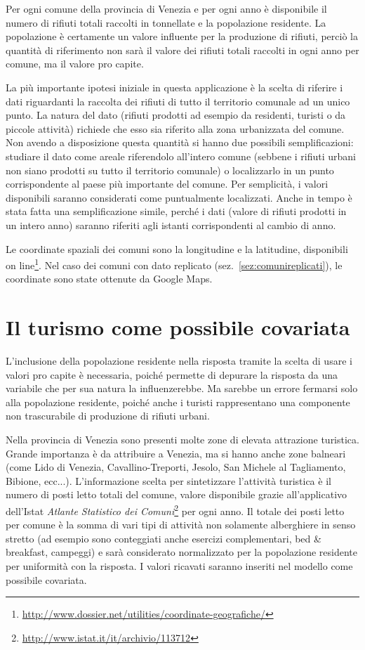 \documentclass[a4paper,11pt,twoside,openright]{book}							%
\begin{document}
Per ogni comune della provincia di Venezia e per ogni anno è disponibile il numero di rifiuti totali raccolti in tonnellate e la popolazione residente. La popolazione è certamente un valore influente per la produzione di rifiuti, perciò la quantità di riferimento non sarà il valore dei rifiuti totali raccolti in ogni anno per comune, ma il valore pro capite.

La più importante ipotesi iniziale in questa applicazione è la scelta di riferire i dati riguardanti la raccolta dei rifiuti di tutto il territorio comunale ad un unico punto. La natura del dato (rifiuti prodotti ad esempio da residenti, turisti o da piccole attività) richiede che esso sia riferito alla zona urbanizzata del comune. Non avendo a disposizione questa quantità si hanno due possibili semplificazioni: studiare il dato come areale riferendolo all'intero comune (sebbene i rifiuti urbani non siano prodotti su tutto il territorio comunale) o localizzarlo in un punto corrispondente al paese più importante del comune. Per semplicità, i valori disponibili saranno considerati come puntualmente localizzati. Anche in tempo è stata fatta una semplificazione simile, perché i dati (valore di rifiuti prodotti in un intero anno) saranno riferiti agli istanti corrispondenti al cambio di anno.

Le coordinate spaziali dei comuni sono la longitudine e la latitudine, disponibili on line\footnote{\href{http://www.dossier.net/utilities/coordinate-geografiche/}{http://www.dossier.net/utilities/coordinate-geografiche/}}. Nel caso dei comuni con dato replicato (sez.~\ref{sez:comunireplicati}), le coordinate sono state ottenute da Google Maps.
\section{Il turismo come possibile covariata}

L'inclusione della popolazione residente nella risposta tramite la scelta di usare i valori pro capite è necessaria, poiché permette di depurare la risposta da una variabile che per sua natura la influenzerebbe. Ma sarebbe un errore fermarsi solo alla popolazione residente, poiché anche i turisti rappresentano una componente non trascurabile di produzione di rifiuti urbani.

Nella provincia di Venezia sono presenti molte zone di elevata attrazione turistica. Grande importanza è da attribuire a Venezia, ma si hanno anche zone balneari (come Lido di Venezia, Cavallino-Treporti, Jesolo, San Michele al Tagliamento, Bibione, ecc...). L'informazione scelta per sintetizzare l'attività turistica è il numero di posti letto totali del comune, valore disponibile grazie all'applicativo dell'Istat \textit{Atlante Statistico dei Comuni}\footnote{\href{http://www.istat.it/it/archivio/113712}{http://www.istat.it/it/archivio/113712}} per ogni anno. Il totale dei posti letto per comune è la somma di vari tipi di attività non solamente alberghiere in senso stretto (ad esempio sono conteggiati anche esercizi complementari, bed \& breakfast, campeggi) e sarà considerato normalizzato per la popolazione residente per uniformità con la risposta. I valori ricavati saranno inseriti nel modello come possibile covariata.
\newpage
\end{document}
